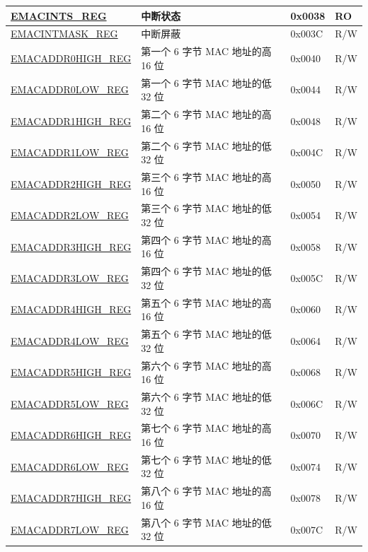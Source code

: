 \begin{longtable}{ |m{6cm} |m{5.3cm} | m{2cm} | m{2.2cm} | }
\hyperref[regdesc:EMACINTSREG]{EMACINTS\_REG} & 中断状态 & 0x0038 & RO \\ \hline
\hyperref[regdesc:EMACINTMASKREG]{EMACINTMASK\_REG} & 中断屏蔽& 0x003C & R/W \\ \hline
\hyperref[regdesc:EMACADDR0HIGHREG]{EMACADDR0HIGH\_REG} & 第一个 6 字节 MAC 地址的高 16 位& 0x0040 & R/W \\ \hline
\hyperref[regdesc:EMACADDR0LOWREG]{EMACADDR0LOW\_REG} & 第一个 6 字节 MAC 地址的低 32 位& 0x0044 & R/W \\ \hline
\hyperref[regdesc:EMACADDR1HIGHREG]{EMACADDR1HIGH\_REG} & 第二个 6 字节 MAC 地址的高 16 位& 0x0048 & R/W \\ \hline
\hyperref[regdesc:EMACADDR1LOWREG]{EMACADDR1LOW\_REG} & 第二个 6 字节 MAC 地址的低 32 位& 0x004C & R/W \\ \hline
\hyperref[regdesc:EMACADDR2HIGHREG]{EMACADDR2HIGH\_REG} & 第三个 6 字节 MAC 地址的高 16 位& 0x0050 & R/W \\ \hline
\hyperref[regdesc:EMACADDR2LOWREG]{EMACADDR2LOW\_REG} & 第三个 6 字节 MAC 地址的低 32 位& 0x0054 & R/W \\ \hline
\hyperref[regdesc:EMACADDR3HIGHREG]{EMACADDR3HIGH\_REG} &  第四个 6 字节 MAC 地址的高 16 位 & 0x0058 & R/W \\ \hline
\hyperref[regdesc:EMACADDR3LOWREG]{EMACADDR3LOW\_REG} & 第四个 6 字节 MAC 地址的低 32 位 & 0x005C & R/W \\ \hline
\hyperref[regdesc:EMACADDR4HIGHREG]{EMACADDR4HIGH\_REG} &  第五个 6 字节 MAC 地址的高 16 位 & 0x0060 & R/W \\ \hline
\hyperref[regdesc:EMACADDR4LOWREG]{EMACADDR4LOW\_REG} & 第五个 6 字节 MAC 地址的低 32 位 & 0x0064 & R/W \\ \hline
\hyperref[regdesc:EMACADDR5HIGHREG]{EMACADDR5HIGH\_REG} &  第六个 6 字节 MAC 地址的高 16 位 & 0x0068 & R/W \\ \hline
\hyperref[regdesc:EMACADDR5LOWREG]{EMACADDR5LOW\_REG} & 第六个 6 字节 MAC 地址的低 32 位 & 0x006C & R/W \\ \hline
\hyperref[regdesc:EMACADDR6HIGHREG]{EMACADDR6HIGH\_REG} &  第七个 6 字节 MAC 地址的高 16 位 & 0x0070 & R/W \\ \hline
\hyperref[regdesc:EMACADDR6LOWREG]{EMACADDR6LOW\_REG} & 第七个 6 字节 MAC 地址的低 32 位 & 0x0074 & R/W \\ \hline
\hyperref[regdesc:EMACADDR7HIGHREG]{EMACADDR7HIGH\_REG} &  第八个 6 字节 MAC 地址的高 16 位 & 0x0078 & R/W \\ \hline
\hyperref[regdesc:EMACADDR7LOWREG]{EMACADDR7LOW\_REG} & 第八个 6 字节 MAC 地址的低 32 位 & 0x007C & R/W \\ \hline


\end{longtable}
